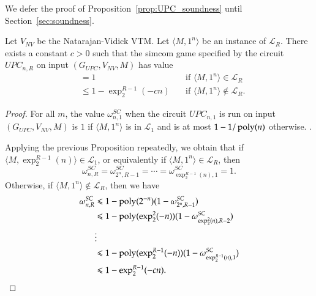 We defer the proof of Proposition~\ref{prop:UPC_soundness} until Section~\ref{sec:soundness}. 


\begin{corollary}
\label{cor:recursive_enl}
Let $V_{NV}$ be the Natarajan-Vidick VTM. Let $\langle M,1^n \rangle$ be an instance of $\mathcal{L}_R$. There exists a constant $c > 0$ such that the simcom game specified by the circuit $UPC_{n,R}$ on input $(G_{UPC},V_{NV},M)$ has value 
\begin{align*}
		&= 1  \quad & \text{if } \langle M,1^n \rangle\in \mathcal{L}_R \\
		&\leq 1 - \exp^{R-1}_2(-cn) \quad &\text{if } \langle M,1^n \rangle\notin \mathcal{L}_R.
\end{align*}
\end{corollary}
\begin{proof}
	For all $m$, the value $\omega_{n,1}^{SC}$ when the circuit $UPC_{n,1}$ is run on input $(G_{UPC},V_{NV},M)$ is $1$ if $\langle M,1^n \rangle$ is in $\mathcal{L}_1$ and is at most $1 - 1/\operatorname{poly}(n)$ otherwise. .
	
	Applying the previous Proposition repeatedly, we obtain that if $\langle M,\exp^{R-1}_2(n) \rangle \in \mathcal{L}_1$, or equivalently if $\langle M,1^n \rangle \in \mathcal{L}_R$, then
	\[
		\omega_{n,R}^{SC} = \omega_{2^n,R-1}^{SC} = \cdots = \omega_{\exp^{R-1}_2(n),1}^{SC} = 1.
	\]
	Otherwise, if  $\langle M,1^n \rangle \notin \mathcal{L}_R$, then we have
	\begin{align*}
		\omega_{n,R}^{SC} &\leqslant 1 - \operatorname{poly}(2^{-n})(1-\omega_{2^n,R-1}^{SC}) \\
					&\leqslant 1 - \operatorname{poly}(\exp^2_2(-n))(1- \omega_{\exp^2_2(n),R-2}^{SC}) \\
					&\vdots \\
					&\leqslant 1 - \operatorname{poly}(\exp^{R-1}_2(-n))(1-\omega_{\exp^{R-1}_2(n),1}^{SC}) \\
					&\leqslant 1 - \exp^{R-1}_2(-cn).
	\end{align*}
\end{proof}


